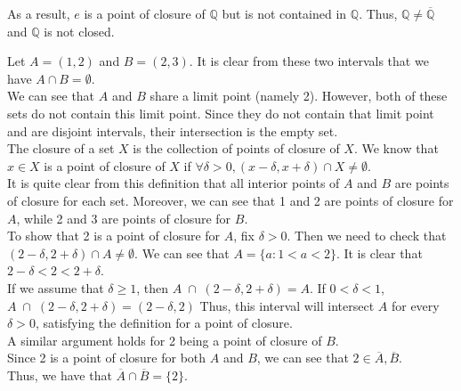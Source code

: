 \documentclass[12pt]{article}
\newenvironment{problem}[2][Problem]{\begin{trivlist}
\item[\hskip \labelsep {\bfseries #1}\hskip \labelsep {\bfseries #2.}]}{\end{trivlist}}
\begin{document}
As a result, $e$ is a point of closure of $\mathbb{Q}$ but is not contained in $\mathbb{Q}$. Thus, $\mathbb{Q} \neq \overline{\mathbb{Q}}$ and $\mathbb{Q}$ is not closed.

\begin{problem}{4}
\end{problem}

Let $A = (1, 2)$ and $B = (2, 3)$. It is clear from these two intervals that we have $A \cap B = \emptyset$.\\


We can see that $A$ and $B$ share a limit point (namely 2). However, both of these sets do not contain this limit point. Since they do not contain that limit point and are disjoint intervals, their intersection is the empty set.\\

The closure of a set $X$ is the collection of points of closure of $X$. We know that $x \in X$ is a point of closure of $X$ if $\forall \delta > 0, (x - \delta, x + \delta) \cap X \neq \emptyset$.\\

It is quite clear from this definition that all interior points of $A$ and $B$ are points of closure for each set. Moreover, we can see that 1 and 2 are points of closure for $A$, while 2 and 3 are points of closure for $B$.\\

To show that 2 is a point of closure for $A$, fix $\delta > 0$. Then we need to check that $(2 - \delta, 2 + \delta) \cap A \neq \emptyset$. We can see that $A = \{a: 1 < a < 2\}$. It is clear that $2 - \delta < 2 < 2 + \delta$.\\

If we assume that $\delta \geq 1$, then $A \; \cap \; (2 - \delta, 2 + \delta) = A$. If $0 < \delta < 1$, $A \; \cap \; (2 - \delta, 2 + \delta) = (2 - \delta, 2)$ Thus, this interval will intersect $A$ for every $\delta > 0$, satisfying the definition for a point of closure.\\

A similar argument holds for 2 being a point of closure of $B$.\\

Since 2 is a point of closure for both $A$ and $B$, we can see that $2 \in \overline{A}, \overline{B}$.\\

Thus, we have that $\overline{A} \cap \overline{B} = \{2\}$.\\
\end{document}
